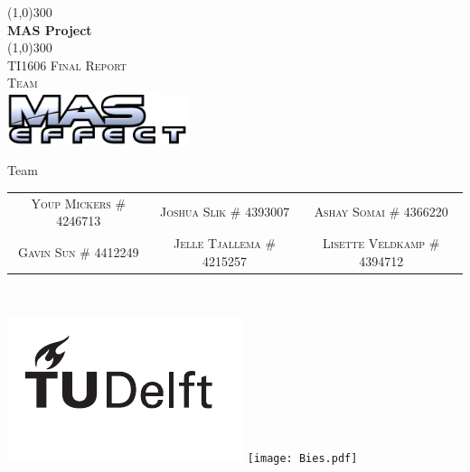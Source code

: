 \begin{titlepage}
	\begin{center}
		\vspace*{2cm}
		\line(1,0){300} \\ [2mm]
		\huge{\bf MAS Project} \\ [-3mm]
		\line(1,0){300} \\ [1cm]
		\textsc{\LARGE TI1606 Final Report} \\ [2cm]
		\textsc{Team} \\
		\vspace{2mm}
		\includegraphics[width=200px]{./contents/graphics/MAS-Effect.pdf}\\
		\vspace{1cm}
		
		\Large
		Team \\ [5mm]
		\normalsize
		
		\begin{tabular}{c c c}
			\textsc{Youp Mickers}		\newline	\textsc{\# 4246713}		&
			\textsc{Joshua Slik}		\newline	\textsc{\# 4393007}		&
			\textsc{Ashay Somai}		\newline 	\textsc{\# 4366220}		\\
			\newline
			\textsc{Gavin Sun}			\newline	\textsc{\# 4412249} 	&
			\textsc{Jelle Tjallema}		\newline	\textsc{\# 4215257}		&
			\textsc{Lisette Veldkamp}	\newline	\textsc{\# 4394712}
		\end{tabular}
		\\[5mm]
	\end{center}
	\vfill
	\includegraphics{./contents/graphics/TU_Deflt_Logo_Black.pdf}
	\texttt{[image: Bies.pdf]}
\end{titlepage}